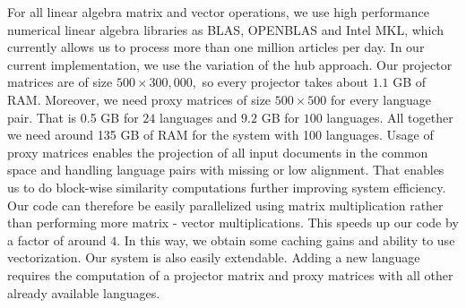 For all linear algebra matrix and vector operations, we use high performance numerical linear algebra libraries as BLAS, OPENBLAS and Intel MKL, which currently allows us to process more than one million articles per day.
In our current implementation, we use the variation of the hub approach. Our projector matrices are of size $500\times 300,000,$ so every projector takes about $1.1$ GB of RAM. Moreover, we need proxy matrices of size $500\times500$ for every language pair. That is 0.5 GB for $24$ languages and $9.2$ GB for $100$ languages. All together we need around 135 GB of RAM for the system with 100 languages.
 Usage of proxy matrices enables the projection of all input documents in the common space and handling language pairs with missing or low alignment. That enables us to do block-wise similarity computations further improving system efficiency. Our code can therefore be easily parallelized using matrix multiplication rather than performing more matrix - vector multiplications. This speeds up our code by a factor of around $4.$ In this way, we obtain some caching gains and ability to use vectorization.
Our system is also easily extendable. Adding a new language requires the  computation of  a projector matrix and proxy matrices with all other already available languages.


